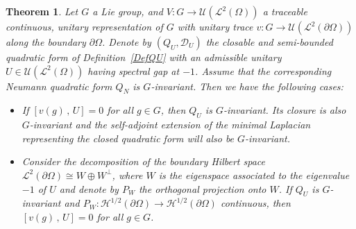 \documentclass[a4paper,12pt]{amsart}
\renewcommand{\L}{\mathcal{L}}
\newcommand{\pO}{{\partial \Omega}}
\newcommand{\1}{\mathbb{I}}
\newtheorem{theorem}{Theorem}
\numberwithin{equation}{section}
\numberwithin{theorem}{section}
\begin{document}
\begin{theorem}\label{repcommutation}
Let $G$ a Lie group, and $V\colon G\to \mathcal{U}(\L^2(\Omega))$ a traceable continuous, unitary representation of $G$ with unitary trace
$v\colon G\to\mathcal{U}(\L^2(\pO))$ along the boundary $\partial\Omega$. Denote by $(Q_U,\mathcal{D}_U)$ the closable and 
semi-bounded quadratic form of Definition~\ref{DefQU} with an admissible unitary $U\in\mathcal{U}(\L^2(\Omega))$ 
having spectral gap at $-1$. Assume that the corresponding 
Neumann quadratic form $Q_N$ is $G$-invariant. Then we have the following cases:
\begin{itemize}
 \item[(i)] If $[v (g)\,,\,U]=0$ for all $g\in G$, then $Q_U$ is $G$-invariant. Its closure is also $G$-invariant and the self-adjoint extension
            of the minimal Laplacian representing the closed quadratic form will also be $G$-invariant.
 \item[(ii)] Consider the decomposition of the boundary Hilbert space $\L^2(\pO)\cong W\oplus W^\perp$, where $W$ is the eigenspace associated
             to the eigenvalue $-1$ of $U$ and denote by $P_W$ the orthogonal projection onto $W$. If $Q_U$ is $G$-invariant and 
             $P_W\colon\mathcal{H}^{1/2}(\partial\Omega)\to \mathcal{H}^{1/2}(\partial\Omega)$ continuous, then $[v (g)\,,\,U]=0$
             for all $g\in G$.
\end{itemize}
\end{theorem}
\end{document}
